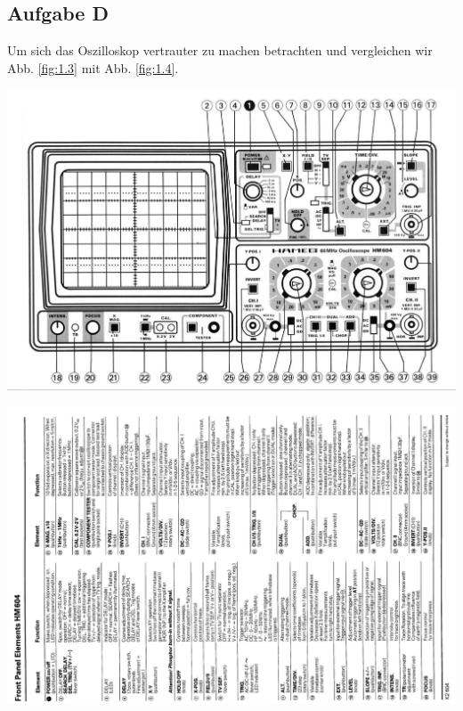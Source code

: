 \documentclass[10pt]{article}
\newenvironment{Figure}
  {\par\medskip\noindent\minipage{\linewidth}}
  {\endminipage\par\medskip}
\begin{document}
\begin{multicols}{2}
	\subsection{Aufgabe D}
	Um sich das Oszilloskop vertrauter zu machen betrachten und vergleichen wir Abb. \ref{fig:1.3} mit Abb. \ref{fig:1.4}.
	\begin{Figure}
		\centering
		\includegraphics[width=0.9\linewidth]{OszI_font.png}
		\label{fig:1.3}
	\end{Figure}
	\begin{Figure}
		\centering
		\includegraphics[angle=270, origin=c,width=0.9\linewidth]{oszi_manuel.png}
		\label{fig:1.4}
	\end{Figure}

\end{multicols}
\end{document}
